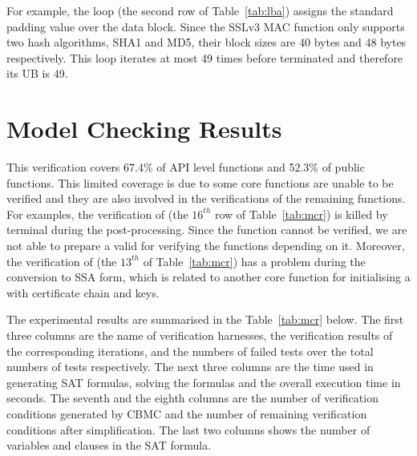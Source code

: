 For example, the loop  (the second row of Table~\ref{tab:lba}) assigns the standard padding value over the data block. Since the SSLv3 MAC function only supports two hash algorithms, SHA1 and MD5, their block sizes are 40 bytes and 48 bytes respectively. This loop iterates at most 49 times before terminated and therefore its UB is 49.



\section{Model Checking Results}
\label{sec:mcr}
This verification covers 67.4\% of API level functions and 52.3\% of public functions. This limited coverage is due to some core functions are unable to be verified and they are also involved in the verifications of the remaining functions. For examples, the verification of  (the $16^{th}$ row of Table~\ref{tab:mcr}) is killed by terminal during the post-processing. Since the function  cannot be verified, we are not able to prepare a valid  for verifying the functions depending on it. Moreover, the verification of  (the $13^{th}$ of Table~\ref{tab:mcr}) has a problem during the conversion to SSA form, which is related to another core function  for initialising a  with certificate chain and keys.





The experimental results are summarised in the Table~\ref{tab:mcr} below. The first three columns are the name of verification harnesses, the verification results of the corresponding iterations, and the numbers of failed tests over the total numbers of tests respectively. The next three columns are the time used in generating 
SAT formulas, solving the formulas and the overall execution time in seconds. The seventh and the eighth columns are the number of verification conditions generated by CBMC and the number of remaining verification conditions after simplification. The last two columns shows the number of variables and clauses in the SAT formula.

